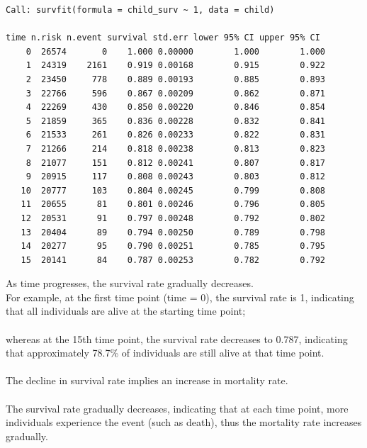 \documentclass[12pt,letterpaper]{article}
\begin{document}
\begin{verbatim}
Call: survfit(formula = child_surv ~ 1, data = child)

time n.risk n.event survival std.err lower 95% CI upper 95% CI
    0  26574       0    1.000 0.00000        1.000        1.000
    1  24319    2161    0.919 0.00168        0.915        0.922
    2  23450     778    0.889 0.00193        0.885        0.893
    3  22766     596    0.867 0.00209        0.862        0.871
    4  22269     430    0.850 0.00220        0.846        0.854
    5  21859     365    0.836 0.00228        0.832        0.841
    6  21533     261    0.826 0.00233        0.822        0.831
    7  21266     214    0.818 0.00238        0.813        0.823
    8  21077     151    0.812 0.00241        0.807        0.817
    9  20915     117    0.808 0.00243        0.803        0.812
   10  20777     103    0.804 0.00245        0.799        0.808
   11  20655      81    0.801 0.00246        0.796        0.805
   12  20531      91    0.797 0.00248        0.792        0.802
   13  20404      89    0.794 0.00250        0.789        0.798
   14  20277      95    0.790 0.00251        0.785        0.795
   15  20141      84    0.787 0.00253        0.782        0.792
\end{verbatim}
\noindent
As time progresses, the survival rate gradually decreases.\\
For example, at the first time point (time = 0), the survival rate is 1, indicating that all individuals are alive at the starting time point;\\\\
whereas at the 15th time point, the survival rate decreases to 0.787, indicating that approximately 78.7\% of individuals are still alive at that time point.\\\\
The decline in survival rate implies an increase in mortality rate.\\\\
The survival rate gradually decreases, indicating that at each time point, more individuals experience the event (such as death), thus the mortality rate increases gradually.
\end{document}
